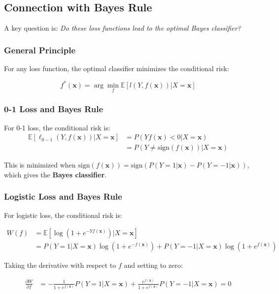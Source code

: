 \documentclass[12pt,a4paper]{article}
\begin{document}
\subsection{Connection with Bayes Rule}

A key question is: \textit{Do these loss functions lead to the optimal Bayes classifier?}

\subsubsection{General Principle}

For any loss function, the optimal classifier minimizes the conditional risk:

\begin{equation}
f^*(\mathbf{x}) = \arg\min_f \mathbb{E}[l(Y, f(\mathbf{x})) | X = \mathbf{x}]
\end{equation}

\subsubsection{0-1 Loss and Bayes Rule}

For 0-1 loss, the conditional risk is:
\begin{align}
\mathbb{E}[\ell_{0-1}(Y, f(\mathbf{x})) | X = \mathbf{x}] &= P(Yf(\mathbf{x}) < 0 | X = \mathbf{x}) \\
&= P(Y \neq \text{sign}(f(\mathbf{x})) | X = \mathbf{x})
\end{align}

This is minimized when $\text{sign}(f(\mathbf{x})) = \text{sign}(P(Y=1|\mathbf{x}) - P(Y=-1|\mathbf{x}))$, which gives the \textbf{Bayes classifier}.

\subsubsection{Logistic Loss and Bayes Rule}

For logistic loss, the conditional risk is:

\begin{align}
W(f) &= \mathbb{E}[\log(1 + e^{-Yf(\mathbf{x})}) | X = \mathbf{x}] \\
&= P(Y = 1|X = \mathbf{x}) \log(1 + e^{-f(\mathbf{x})}) + P(Y = -1|X = \mathbf{x}) \log(1 + e^{f(\mathbf{x})})
\end{align}

Taking the derivative with respect to $f$ and setting to zero:

\begin{align}
\frac{\partial W}{\partial f} &= -\frac{1}{1 + e^{f(\mathbf{x})}} P(Y = 1|X = \mathbf{x}) + \frac{e^{f(\mathbf{x})}}{1 + e^{f(\mathbf{x})}} P(Y = -1|X = \mathbf{x}) = 0
\end{align}
\end{document}
